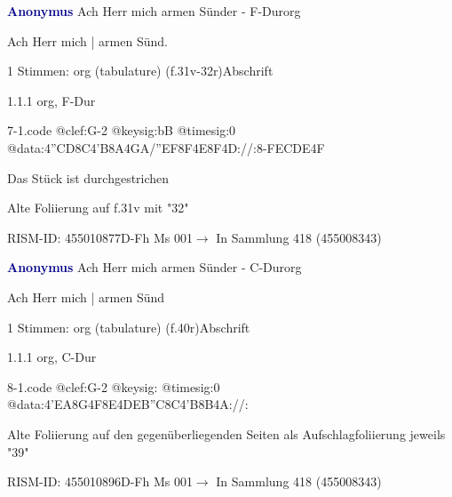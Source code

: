 \documentclass[twocolumn, 12pt]{book}
\begin{document}
\par \vspace{16pt} \textcolor{darkblue}{\textbf{Anonymus  }}\hfillplus{\textbf{[7]}}\newline Ach Herr mich armen Sünder - F-Dur\newline org
\par \begin{itshape}[f.31v, at left:] Ach Herr mich | armen Sünd.\end{itshape} 
\par \textcolor{darkblue}{}  1 Stimmen: org (tabulature)  (f.31v-32r)\newline Abschrift
\par 1.1.1  org, F-Dur  
\begin{filecontents*}{7-1.code}
@clef:G-2
@keysig:bB
@timesig:0
@data:4''CD8C4'B8A4GA/''EF8F4E8F4D://:8-FEC{DE}4F
\end{filecontents*}
\newline %
\par Das Stück ist durchgestrichen
\par Alte Foliierung auf f.31v mit "32"
\par RISM-ID: 455010877\newline D-Fh  Ms 001\newline $\rightarrow$ In Sammlung 418 (455008343)
      
\par \vspace{16pt} \textcolor{darkblue}{\textbf{Anonymus  }}\hfillplus{\textbf{[8]}}\newline Ach Herr mich armen Sünder - C-Dur\newline org
\par \begin{itshape}[f.40r, at left:] Ach Herr mich | armen Sünd\end{itshape} 
\par \textcolor{darkblue}{}  1 Stimmen: org (tabulature)  (f.40r)\newline Abschrift
\par 1.1.1  org, C-Dur  
\begin{filecontents*}{8-1.code}
@clef:G-2
@keysig:
@timesig:0
@data:4'EA8G4F8E4DEB''C8C4'B8B4A://:
\end{filecontents*}
\newline %
\par Alte Foliierung auf den gegenüberliegenden Seiten als Aufschlagfoliierung jeweils "39"
\par RISM-ID: 455010896\newline D-Fh  Ms 001\newline $\rightarrow$ In Sammlung 418 (455008343)
      
\end{document}
